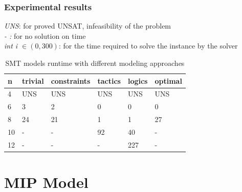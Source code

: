 \documentclass{article}
\begin{document}
\subsubsection{Experimental results}
\textit{UNS}: for proved UNSAT, infeasibility of the problem \\
\textit{-  :} for no solution on time \\
\textit{int i $\in (0,300)$}: for the time required to solve the instance by the solver
\begin{table}[H]
\centering
{\small
\begin{tabular}{ |p{0.4cm}|p{1.8cm}|p{1.8cm}|p{1.8cm}|p{1.8cm}|p{1.8cm}| }
 \hline
 \textbf{n} & \textbf{trivial} & \textbf{constraints} & \textbf{tactics} & \textbf{logics} & \textbf{optimal} \\
 \hline
 4  & UNS & UNS & UNS & UNS & UNS \\
 6  & 3 & 2 & 0 & 0 & 0 \\
 8  & 24 & 21 & 1 & 1 & 27 \\
 10 & - & - & 92 & 40 & - \\
 12 & - & - & - & 227 & - \\
 \hline
\end{tabular}}

\caption{SMT models runtime with different modeling approaches}
\label{table:smt_models}
\end{table}



\section{MIP Model}
\end{document}
